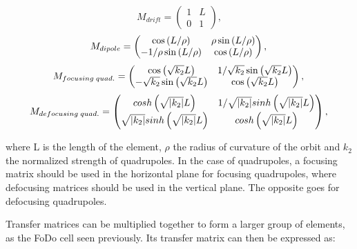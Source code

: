 \begin{equation}
    M_{drift} = \begin{pmatrix}
                    1 & L \\
                    0 & 1 
                \end{pmatrix},
\end{equation}
\begin{equation}
    M_{dipole} = \begin{pmatrix}
                    \cos\left(L/\rho\right) & \rho \sin\left(L/\rho\right) \\
                    -1/\rho \sin\left(L/\rho\right) & \cos\left(L/\rho\right)
                 \end{pmatrix}, \\
\end{equation}
\begin{equation}
    M_{focusing\;quad.} = \begin{pmatrix}
                             \cos\left(\sqrt{k_2}L\right) & 1/\sqrt{k_2} \sin\left(\sqrt{k_2}L\right) \\
                             -\sqrt{k_2}\sin\left(\sqrt{k_2}L\right) & \cos\left(\sqrt{k_2}L\right)
                          \end{pmatrix},\\
\end{equation}
\begin{equation}
    M_{defocusing\;quad.} = \begin{pmatrix}
                        cosh\left(\sqrt{|k_2|}L \right) & 1/\sqrt{|k_2|} sinh\left(\sqrt{|k_2|} L\right) \\
                        \sqrt{|k_2|} sinh\left(\sqrt{|k_2|} L\right) & cosh\left(\sqrt{|k_2|} L \right)
                            \end{pmatrix},\\
\end{equation}

where L is the length of the element, $\rho$ the radius of curvature of the orbit and $k_2$ the
normalized strength of quadrupoles. In the case of quadrupoles, a focusing matrix should be used in
the horizontal plane for focusing quadrupoles, where defocusing matrices should be used in the
vertical plane. The opposite goes for defocusing quadrupoles.

Transfer matrices can be multiplied together to form a larger group of elements, as the FoDo cell
seen previously. Its transfer matrix can then be expressed as:


